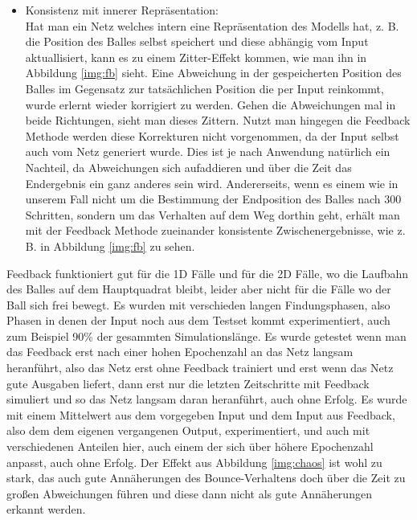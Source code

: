 \begin{description}
\begin{itemize}
		\item Konsistenz mit innerer Repräsentation: \hfill \\
		 Hat man ein Netz welches intern eine Repräsentation des Modells hat, z. B. die Position des Balles selbst speichert und diese abhängig vom Input aktuallisiert, kann es zu einem Zitter-Effekt kommen, wie man ihn in Abbildung \ref{img:fb} sieht. Eine Abweichung in der gespeicherten Position des Balles im Gegensatz zur tatsächlichen Position die per Input reinkommt, wurde erlernt wieder korrigiert zu werden. Gehen die Abweichungen mal in beide Richtungen, sieht man dieses Zittern. Nutzt man hingegen die Feedback Methode werden diese Korrekturen nicht vorgenommen, da der Input selbst auch vom Netz generiert wurde. Dies ist je nach Anwendung natürlich ein Nachteil, da Abweichungen sich aufaddieren und über die Zeit das Endergebnis ein ganz anderes sein wird. Andererseits, wenn es einem wie in unserem Fall nicht um die Bestimmung der Endposition des Balles nach 300 Schritten, sondern um das Verhalten auf dem Weg dorthin geht, erhält man mit der Feedback Methode zueinander konsistente Zwischenergebnisse, wie z. B. in Abbildung \ref{img:fb} zu sehen.
	\end{itemize}
	Feedback funktioniert gut für die 1D Fälle und für die 2D Fälle, wo die Laufbahn des Balles auf dem Hauptquadrat bleibt, leider aber nicht für die Fälle wo der Ball sich frei bewegt. Es wurden mit verschieden langen Findungsphasen, also Phasen in denen der Input noch aus dem Testset kommt experimentiert, auch zum Beispiel 90\% der gesammten Simulationslänge. Es wurde getestet wenn man das Feedback erst nach einer hohen Epochenzahl an das Netz langsam heranführt, also das Netz erst ohne Feedback trainiert und erst wenn das Netz gute Ausgaben liefert, dann erst nur die letzten Zeitschritte mit Feedback simuliert und so das Netz langsam daran heranführt, auch ohne Erfolg. Es wurde mit einem Mittelwert aus dem vorgegeben Input und dem Input aus Feedback, also dem dem eigenen vergangenen Output, experimentiert, und auch mit verschiedenen Anteilen hier, auch einem der sich über höhere Epochenzahl anpasst, auch ohne Erfolg. Der Effekt aus Abbildung \ref{img:chaos} ist wohl zu stark, das auch gute Annäherungen des Bounce-Verhaltens doch über die Zeit zu großen Abweichungen führen und diese dann nicht als gute Annäherungen erkannt werden. 
	

\end{description}
